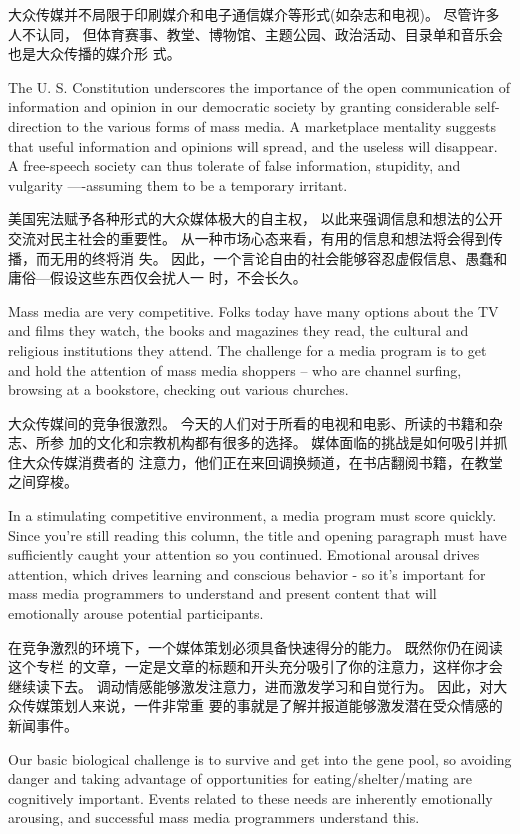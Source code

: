 \documentclass[cs4size, a4paper, 12pt]{article}
\newcounter{numpar}
\newcommand*{\newpar}{\numpar{}}
\begin{document}
	大众传媒并不局限于印刷媒介和电子通信媒介等形式(如杂志和电视)。  尽管许多人不认同， 但体育赛事、教堂、博物馆、主题公园、政治活动、目录单和音乐会也是大众传播的媒介形 式。 
	
	\newpar The U. S. Constitution underscores the importance of the open communication of information and opinion in our democratic society by granting considerable self-direction to the various forms of mass media. A marketplace mentality suggests that useful information and opinions will spread, and the useless will disappear. A free-speech society can thus tolerate of false information, stupidity, and vulgarity ----assuming them to be a   temporary irritant.
	
	美国宪法赋予各种形式的大众媒体极大的自主权， 以此来强调信息和想法的公开交流对民主社会的重要性。 从一种市场心态来看，有用的信息和想法将会得到传播，而无用的终将消 失。 因此，一个言论自由的社会能够容忍虚假信息、愚蠢和庸俗—假设这些东西仅会扰人一 时，不会长久。 
	
	\newpar Mass media are very competitive. Folks today have many options  about the TV and films they watch, the books and magazines they read, the cultural and religious institutions they attend. The challenge for a media program is to get and hold the attention of mass media shoppers -- who  are channel surfing, browsing at a bookstore, checking out various churches.
	
	大众传媒间的竞争很激烈。 今天的人们对于所看的电视和电影、所读的书籍和杂志、所参 加的文化和宗教机构都有很多的选择。  媒体面临的挑战是如何吸引并抓住大众传媒消费者的 注意力，他们正在来回调换频道，在书店翻阅书籍，在教堂之间穿梭。  
	
	\newpar In a stimulating competitive environment, a media program must   score quickly. Since you're still reading this column, the title and opening paragraph must have sufficiently caught your attention so you continued. Emotional arousal drives attention, which drives learning and conscious behavior - so it's important for mass media programmers to understand and present content that will emotionally arouse potential participants.
	
	在竞争激烈的环境下，一个媒体策划必须具备快速得分的能力。 既然你仍在阅读这个专栏 的文章，一定是文章的标题和开头充分吸引了你的注意力，这样你才会继续读下去。 调动情感能够激发注意力，进而激发学习和自觉行为。 因此，对大众传媒策划人来说，一件非常重 要的事就是了解并报道能够激发潜在受众情感的新闻事件。 
	
	
	
	\newpar Our basic biological challenge is to survive and get into the gene pool, so avoiding danger and taking advantage of opportunities for eating/shelter/mating are cognitively important. Events related to these needs are inherently emotionally arousing, and successful mass media programmers understand this.
	
\end{document}
